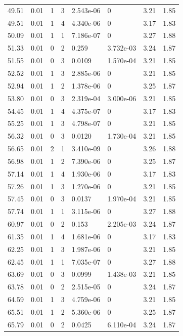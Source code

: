\documentclass[preview]{standalone}
\begin{document}
{{{\begin{tabular}{L{1.2cm}C{1.2cm} C{0.3cm}C{0.5cm} C{1.4cm}C{1.4cm} C{1.4cm}C{1.4cm}}
  49.51  &  0.01  & 1     &  3 &  2.543e-06  & 0  & 3.21 &  1.85   \\ 
  49.51  &  0.01  & 1     &  4 &  4.340e-06  & 0  & 3.17 &  1.83   \\ 
  50.09  &  0.01  & 1     &  1 &  7.186e-07  & 0  & 3.27 &  1.88   \\ 
  51.33  &  0.01  & 0     &  2 &  0.259  & 3.732e-03  & 3.24 &  1.87   \\ 
  51.55  &  0.01  & 0     &  3 &  0.0109  & 1.570e-04  & 3.21 &  1.85   \\ 
  52.52  &  0.01  & 1     &  3 &  2.885e-06  & 0  & 3.21 &  1.85   \\ 
  52.94  &  0.01  & 1     &  2 &  1.378e-06  & 0  & 3.25 &  1.87   \\ 
  53.80  &  0.01  & 0     &  3 &  2.319e-04  & 3.000e-06  & 3.21 &  1.85   \\ 
  54.45  &  0.01  & 1     &  4 &  4.375e-07  & 0  & 3.17 &  1.83   \\ 
  55.25  &  0.01  & 1     &  3 &  4.798e-07  & 0  & 3.21 &  1.85   \\ 
  56.32  &  0.01  & 0     &  3 &  0.0120  & 1.730e-04  & 3.21 &  1.85   \\ 
  56.65  &  0.01  & 2     &  1 &  3.410e-09  & 0  & 3.26 &  1.88   \\ 
  56.98  &  0.01  & 1     &  2 &  7.390e-06  & 0  & 3.25 &  1.87   \\ 
  57.14  &  0.01  & 1     &  4 &  1.930e-06  & 0  & 3.17 &  1.83   \\ 
  57.26  &  0.01  & 1     &  3 &  1.270e-06  & 0  & 3.21 &  1.85   \\ 
  57.45  &  0.01  & 0     &  3 &  0.0137  & 1.970e-04  & 3.21 &  1.85   \\ 
  57.74  &  0.01  & 1     &  1 &  3.115e-06  & 0  & 3.27 &  1.88   \\ 
  60.97  &  0.01  & 0     &  2 &  0.153  & 2.205e-03  & 3.24 &  1.87   \\ 
  61.35  &  0.01  & 1     &  4 &  1.681e-06  & 0  & 3.17 &  1.83   \\ 
  62.25  &  0.01  & 1     &  3 &  1.987e-06  & 0  & 3.21 &  1.85   \\ 
  62.45  &  0.01  & 1     &  1 &  7.035e-07  & 0  & 3.27 &  1.88   \\ 
  63.69  &  0.01  & 0     &  3 &  0.0999  & 1.438e-03  & 3.21 &  1.85   \\ 
  63.78  &  0.01  & 0     &  2 &  2.515e-05  & 0  & 3.24 &  1.87   \\ 
  64.59  &  0.01  & 1     &  3 &  4.759e-06  & 0  & 3.21 &  1.85   \\ 
  65.51  &  0.01  & 1     &  2 &  5.360e-06  & 0  & 3.25 &  1.87   \\ 
  65.79  &  0.01  & 0     &  2 &  0.0425  & 6.110e-04  & 3.24 &  1.87   \\ 
\hline 
\end{tabular} 

}}}
\end{document}
